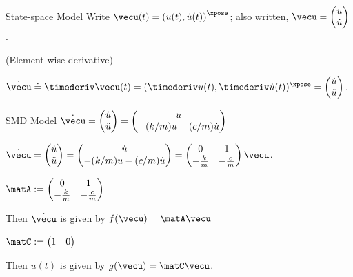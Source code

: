 \documentclass[12pt]{beamer}
\begin{document}
\begin{frame}
\begin{block}{State-space Model}
Write
$\vecu(t) = \left( u(t), \dot u(t) \right)^\xpose$;
also written, 
$\vecu = \begin{pmatrix} u \\ \dot u \end{pmatrix}$.

(Element-wise derivative)

$\dot\vecu
	\doteq \timederiv \vecu(t)
	= ( \timederiv u(t), \timederiv \dot u(t) )^\xpose
	= \begin{pmatrix}
		\dot u \\
		\ddot u
	\end{pmatrix}$.

\end{block}

\begin{block}{SMD Model}
$\dot \vecu
	= \begin{pmatrix} \dot u \\ \ddot u \end{pmatrix}
	= \begin{pmatrix}
		\dot u \\
		-(k/m) u - (c/m) \dot u
		\end{pmatrix}$
		
$\dot \vecu
	= \begin{pmatrix} \dot u \\ \ddot u \end{pmatrix}
	= \begin{pmatrix}
		\dot u \\
		-(k/m) u - (c/m) \dot u
		\end{pmatrix}
	= \begin{pmatrix} 0 & 1 \\ -\frac{k}{m} & -\frac{c}{m} \end{pmatrix}
	\vecu$.
	
\end{block}

\end{frame}


\begin{frame}

\begin{itemize}

\vitem
$\matA := \begin{pmatrix} 0 & 1 \\ -\frac{k}{m} & -\frac{c}{m} \end{pmatrix}$

\vitem
Then $\dot\vecu$ is given by $f(\vecu) = \matA \vecu$

\vitem $\matC := \begin{pmatrix} 1 & 0 \end{pmatrix}$

\vitem
Then $u(t)$ is given by
$g(\vecu) = \matC \vecu$.

\end{itemize}
\vfill\null

\end{frame}
\end{document}
